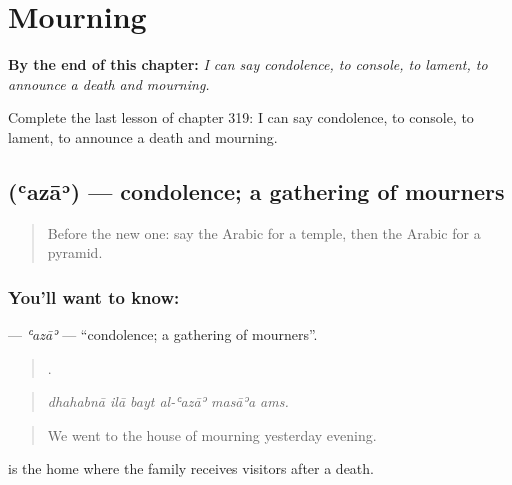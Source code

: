 
\chapter{Mourning}
\label{ch:ar-mourning}

\begin{chapteropening}
\textbf{By the end of this chapter:} \emph{I can say condolence, to console, to lament, to announce a death and mourning.}

Complete the last lesson of chapter 319: I can say condolence, to console, to lament, to announce a death and mourning.
\end{chapteropening}

\section[\texorpdfstring{\ar{عزاء} (ʿazāʾ)}{عزاء (ʿazāʾ)}]{ (ʿazāʾ) — condolence; a gathering of mourners}

\label{lesson:AR-C319-aza}



\begin{quote}
Before the new one: say the Arabic for a temple, then the Arabic for a pyramid.
\end{quote}

\subsection*{You'll want to know: }
\textbf{} — \emph{ʿazāʾ} — \textquotedblleft{}condolence; a gathering of mourners\textquotedblright{}.

\begin{quote}
     .
\end{quote}

\begin{quote}
\emph{dhahabnā ilā bayt al-ʿazāʾ masāʾa ams.}
\end{quote}

\begin{quote}
We went to the house of mourning yesterday evening.
\end{quote}

  is the home where the family receives visitors after a death.

